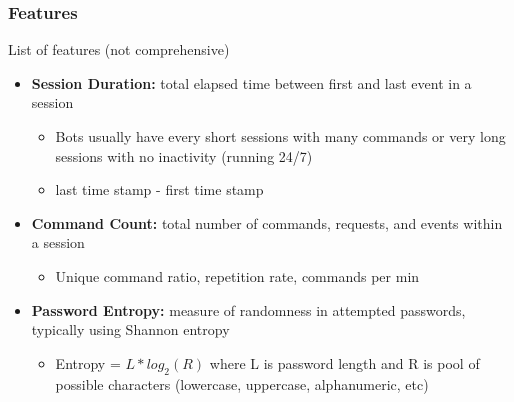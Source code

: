 \documentclass{article}
\begin{document}
\subsubsection{Features}
List of features (not comprehensive) 
\begin{itemize}
    \item \textbf{Session Duration:} total elapsed time between first and last event in a session
    \begin{itemize}
        \item Bots usually have every short sessions with many commands or very long sessions with no inactivity (running 24/7)
        \item last time stamp - first time stamp
    \end{itemize}
    \item \textbf{Command Count:} total number of commands, requests, and events within a session
    \begin{itemize}
        \item Unique command ratio, repetition rate, commands per min 
    \end{itemize}
    \item \textbf{Password Entropy:} measure of randomness in attempted passwords, typically using Shannon entropy
    \begin{itemize}
        \item Entropy = $L* log_2(R)$ where L is password length and R is pool of possible characters (lowercase, uppercase, alphanumeric, etc)
    \end{itemize}
\end{itemize}
\end{document}
